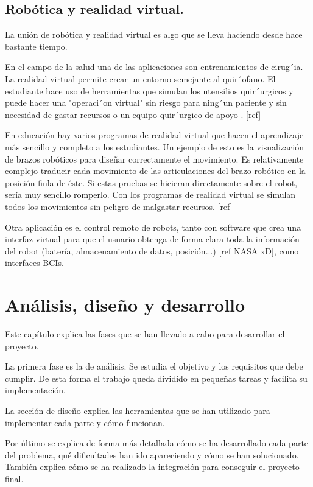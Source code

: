 \documentclass[twoside, 12pt]{epstfg}
\begin{document}
\section{Robótica y realidad virtual.} 
\label{sec:robotica y VR}
La unión de robótica y realidad virtual es algo que se lleva haciendo desde hace bastante tiempo.

En el campo de la salud una de las aplicaciones son entrenamientos de cirug´ia. La realidad virtual permite crear un entorno semejante al quir´ofano. El estudiante hace uso de herramientas que simulan los utensilios quir´urgicos y puede hacer una "operaci´on virtual" sin riesgo para ning´un paciente y sin necesidad de gastar recursos o un equipo quir´urgico de apoyo . [ref]

En educación hay varios programas de realidad virtual que hacen el aprendizaje más sencillo y completo a los estudiantes. Un ejemplo de esto es la visualización de brazos robóticos para diseñar correctamente el movimiento.
Es relativamente complejo traducir cada movimiento de las articulaciones del brazo robótico en la posición finla de éste. Si estas pruebas se hicieran directamente sobre el robot, sería muy sencillo romperlo. Con los programas de realidad virtual se simulan todos los movimientos sin peligro de malgastar recursos. [ref]

Otra aplicación es el control remoto de robots, tanto con software que crea una interfaz virtual para que el usuario obtenga de forma clara toda la información del robot (batería, almacenamiento de datos, posición...) [ref NASA xD], como interfaces BCIs.


\chapter{Análisis, diseño y desarrollo}
\label{chap:sistemadesarrollado}
Este capítulo explica las fases que se han llevado a cabo para desarrollar el proyecto.

La primera fase es la de análisis. Se estudia el objetivo y los requisitos que debe cumplir. De esta forma el trabajo queda dividido en pequeñas tareas y facilita su implementación.

La sección de diseño explica las herramientas que se han utilizado para implementar cada parte y cómo funcionan.

Por último se explica de forma más detallada cómo se ha desarrollado cada parte del problema, qué dificultades han ido apareciendo y cómo se han solucionado. También explica cómo se ha realizado la integración para conseguir el proyecto final.
\end{document}
